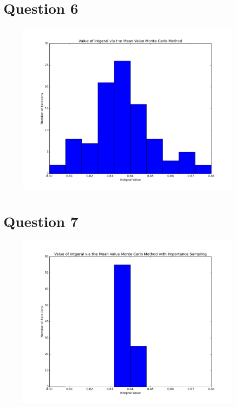 \documentclass[a4paper,12pt]{article}
\begin{document}
\section{Question 6}

\begin{figure}[H]
\centering
\includegraphics[width = \linewidth]{lab10_q6.png}
\caption{}
\label{fig:q6}
\end{figure}

\section{Question 7}

\begin{figure}[H]
\centering
\includegraphics[width = \linewidth]{lab10_q7.png}
\caption{}
\label{fig:q7}
\end{figure}
\end{document}
